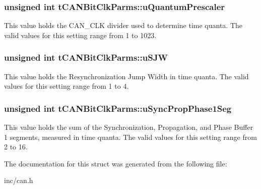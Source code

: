 \subsubsection[{\texorpdfstring{u\+Quantum\+Prescaler}{uQuantumPrescaler}}]{\setlength{\rightskip}{0pt plus 5cm}unsigned int t\+C\+A\+N\+Bit\+Clk\+Parms\+::u\+Quantum\+Prescaler}\hypertarget{structtCANBitClkParms_a2d5f2674b68dfc7f3c47b6113951e41e}{}\label{structtCANBitClkParms_a2d5f2674b68dfc7f3c47b6113951e41e}
This value holds the C\+A\+N\+\_\+\+C\+LK divider used to determine time quanta. The valid values for this setting range from 1 to 1023. 
\subsubsection[{\texorpdfstring{u\+S\+JW}{uSJW}}]{\setlength{\rightskip}{0pt plus 5cm}unsigned int t\+C\+A\+N\+Bit\+Clk\+Parms\+::u\+S\+JW}\hypertarget{structtCANBitClkParms_af7d91d76a38a5fe4a2b814bb54db1348}{}\label{structtCANBitClkParms_af7d91d76a38a5fe4a2b814bb54db1348}
This value holds the Resynchronization Jump Width in time quanta. The valid values for this setting range from 1 to 4. 
\subsubsection[{\texorpdfstring{u\+Sync\+Prop\+Phase1\+Seg}{uSyncPropPhase1Seg}}]{\setlength{\rightskip}{0pt plus 5cm}unsigned int t\+C\+A\+N\+Bit\+Clk\+Parms\+::u\+Sync\+Prop\+Phase1\+Seg}\hypertarget{structtCANBitClkParms_aa99151a686e0a3725b0fd84810ab6d12}{}\label{structtCANBitClkParms_aa99151a686e0a3725b0fd84810ab6d12}
This value holds the sum of the Synchronization, Propagation, and Phase Buffer 1 segments, measured in time quanta. The valid values for this setting range from 2 to 16. 

The documentation for this struct was generated from the following file\+:\begin{DoxyCompactItemize}
\item 
inc/can.\+h\end{DoxyCompactItemize}
